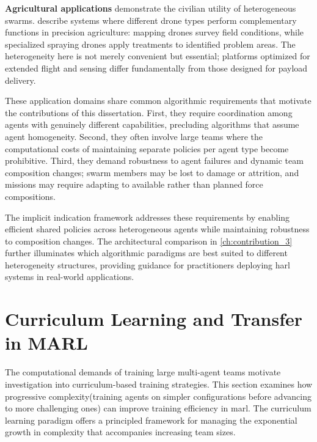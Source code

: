 \textbf{Agricultural applications} demonstrate the civilian 
utility of heterogeneous swarms. \cite{amarasinghe2019} describe 
systems where different drone types perform complementary functions 
in precision agriculture: mapping drones survey field conditions, while 
specialized spraying drones apply treatments to identified problem areas. 
The heterogeneity here is not merely convenient but essential;
platforms optimized for extended flight and sensing differ 
fundamentally from those designed for payload delivery.

These application domains share common algorithmic requirements 
that motivate the contributions of this dissertation. First, 
they require coordination among agents with genuinely different 
capabilities, precluding algorithms that assume agent homogeneity. 
Second, they often involve large teams where the computational 
costs of maintaining separate policies per agent type become 
prohibitive. Third, they demand robustness to agent failures 
and dynamic team composition changes; 
swarm members may be lost to damage or attrition, and missions may 
require adapting to available rather than planned force compositions.

The implicit indication framework addresses these requirements 
by enabling efficient shared policies across heterogeneous agents 
while maintaining robustness to composition changes. 
The architectural comparison in \cref{ch:contribution_3} further 
illuminates which algorithmic paradigms are best suited to 
different heterogeneity structures, providing guidance for 
practitioners deploying \gls{harl} systems in real-world applications.

\section{Curriculum Learning and Transfer in MARL}
\label{sec:curriculum-learning}

The computational demands of training large multi-agent teams 
motivate investigation into curriculum-based training strategies. 
This section examines how progressive complexity(training agents 
on simpler configurations before advancing to more challenging ones) 
can improve training efficiency in \gls{marl}. The curriculum learning 
paradigm offers a principled framework for managing the exponential 
growth in complexity that accompanies increasing team sizes.

